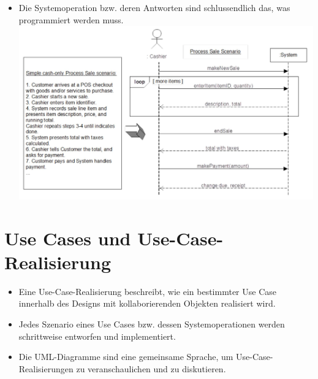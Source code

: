 \documentclass[10pt]{article}
\begin{document}
\begin{itemize}
  \item Die Systemoperation bzw. deren Antworten sind schlussendlich das, was programmiert werden muss.\\
\includegraphics[width=\linewidth]{images/2025_01_02_787afb9584031d2940deg-07}
\end{itemize}

\section*{Use Cases und Use-Case-Realisierung}
\begin{itemize}
  \item Eine Use-Case-Realisierung beschreibt, wie ein bestimmter Use Case innerhalb des Designs mit kollaborierenden Objekten realisiert wird.
  \item Jedes Szenario eines Use Cases bzw. dessen Systemoperationen werden schrittweise entworfen und implementiert.
  \item Die UML-Diagramme sind eine gemeinsame Sprache, um Use-Case-Realisierungen zu veranschaulichen und zu diskutieren.
\end{itemize}
\end{document}
